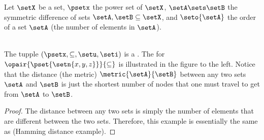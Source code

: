 \begin{example}
\label{ex:d_powerset}
\footnotemark
{}
Let $\setX$ be a set, $\psetx$ the power set of $\setX$,
$\setA\sets \setB$ the symmetric difference of sets $\setA,\setB\subseteq \setX$,
and $\seto{\setA}$ the order of a set $\setA$ (the number of elements in $\setA$).\footnotemark
\\
\hfill%
\begin{minipage}{\tw-43mm}\raggedright
{}
\\
The tupple $(\psetx,\subseteq,\setu,\seti)$ is a .
The  for $\opair{\pset{\setn{x,y,z}}}{\subseteq}$
is illustrated in
the figure to the left.
Notice that the distance (the metric) $\metric{\setA}{\setB}$ between any two sets $\setA$ and $\setB$
is just the shortest number of nodes that one must travel to get from $\setA$ to $\setB$.
\end{minipage}
\end{example}
\begin{proof}
The distance between any two sets is simply the number of elements that
are different between the two sets.
Therefore, this example is essentially the same as 
(Hamming distance example).
\end{proof}



